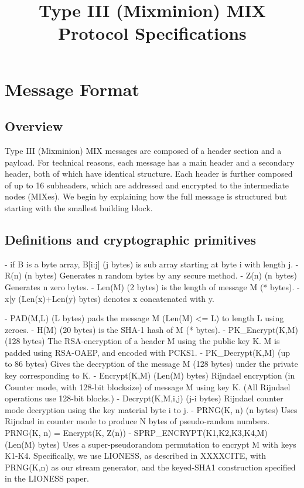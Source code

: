 \title{Type III (Mixminion) MIX Protocol Specifications}

\section{Message Format}

\subsection{Overview}

Type III (Mixminion) MIX messages are composed of a header section and a
payload.  For technical reasons, each message has a main header and a
secondary header, both of which have identical structure.  Each
header is further composed of up to 16 subheaders, which are
addressed and encrypted to the intermediate nodes (MIXes).  We
begin by explaining how the full message is structured but starting
with the smallest building block.

\subsection{Definitions and cryptographic primitives}

- if B is a byte array, B[i:j] (j bytes) is sub array starting at 
  byte i with length j.
- R(n) (n bytes) Generates n random bytes by any secure method.
- Z(n) (n bytes) Generates n zero bytes.
- Len(M) (2 bytes) is the length of message M (* bytes).
- x|y (Len(x)+Len(y) bytes) denotes x concatenated with y.

- PAD(M,L) (L bytes) pads the message M (Len(M) <= L) to length L
  using zeroes.
- H(M) (20 bytes) is the SHA-1 hash of M (* bytes).
- PK_Encrypt(K,M) (128 bytes) The RSA-encryption of a header M 
  using the public key K.  M is padded using RSA-OAEP, and encoded
  with PCKS1.
- PK_Decrypt(K,M) (up to 86 bytes) Gives the decryption of the
  message M (128 bytes) under the private key corresponding to K.
- Encrypt(K,M) (Len(M) bytes) Rijndael encryption (in Counter mode,
  with 128-bit blocksize) of message M using key K.  (All Rijndael
  operations use 128-bit blocks.)
- Decrypt(K,M,i,j) (j-i bytes) Rijndael counter mode decryption 
  using the key material byte i to j.
- PRNG(K, n) (n bytes) Uses Rijndael in counter mode to produce N
  bytes of pseudo-random numbers.
  PRNG(K, n) = Encrypt(K, Z(n))
- SPRP_ENCRYPT(K1,K2,K3,K4,M) (Len(M) bytes) Uses a super-pseudorandom
  permutation to encrypt M with keys K1-K4.  Specifically, we use LIONESS,
  as described in XXXXCITE, with PRNG(K,n) as our stream generator,
  and the keyed-SHA1 construction specified in the LIONESS paper.

